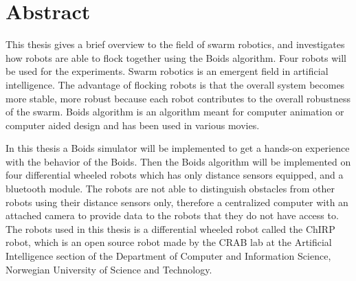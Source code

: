 \section*{Abstract}
\label{sec:abstract}

This thesis gives a brief overview to the field of swarm robotics, and investigates how robots are able to flock together using the Boids algorithm. Four robots will be used for the experiments. Swarm robotics is an emergent field in artificial intelligence. The advantage of flocking robots is that the overall system becomes more stable, more robust because each robot contributes to the overall robustness of the swarm. Boids algorithm is an algorithm meant for computer animation or computer aided design and has been used in various movies.

In this thesis a Boids simulator will be implemented to get a hands-on experience with the behavior of the Boids. Then the Boids algorithm will be implemented on four differential wheeled robots which has only distance sensors equipped, and a bluetooth module. The robots are not able to distinguish obstacles from other robots using their distance sensors only, therefore a centralized computer with an attached camera to provide data to the robots that they do not have access to.
The robots used in this thesis is a differential wheeled robot called the ChIRP robot, which is an open source robot made by the CRAB lab at the Artificial Intelligence section of the Department of Computer and Information Science, Norwegian University of Science and Technology.



%
%

